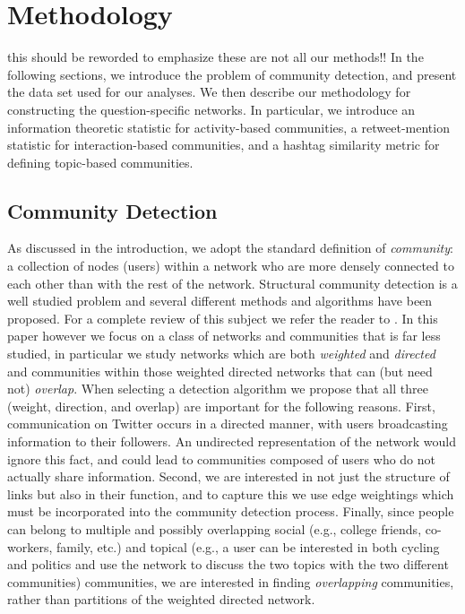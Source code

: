 \section{Methodology}
\DIFdelbegin %

\DIFdelend \DIFaddbegin \alert{this should be reworded to emphasize these are not all our methods!!}
\DIFaddend In the following sections, we introduce the problem of community detection, and present the data set used for our analyses. We then describe our methodology for constructing the question-specific networks. In particular, we introduce an information theoretic statistic for activity-based communities, a retweet-mention statistic for interaction-based communities, and a hashtag similarity metric for defining topic-based communities.

\subsection{Community Detection}

As discussed in the introduction, we adopt the standard definition of \emph{community}: a collection of nodes (users) within a network who are more densely connected to each other than with the rest of the network. Structural community detection is a well studied problem and several different methods and algorithms have been proposed. For a complete review of this subject we refer the reader to \cite{porter2009communities, fortunato2010community}. In this paper however we focus on a class of networks and communities that is far less studied, in particular we study networks which are both \textit{weighted} and \textit{directed} and communities within those weighted directed networks that can (but need not) \emph{overlap}. When selecting a detection algorithm we propose that all three (weight, direction, and overlap) are important for the following reasons. First, communication on Twitter occurs in a directed manner, with users broadcasting information to their followers. An undirected representation of the network would ignore this fact, and could lead to communities composed of users who do not actually share information. Second, we are interested in not just the structure of links but also in their function, and to capture this we use edge weightings which must be incorporated into the community detection process. Finally, since people can belong to multiple and possibly overlapping social (e.g., college friends, co-workers, family, etc.) and topical (e.g., a user can be interested in both cycling and politics and use the network to discuss the two topics with the two different communities) communities, we are interested in finding \textit{overlapping} communities, rather than partitions of the weighted directed network. 

